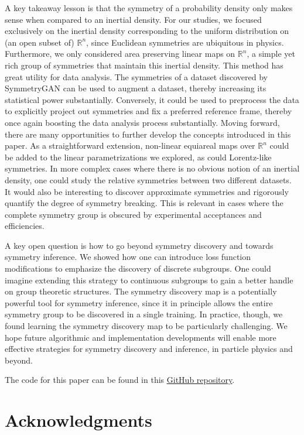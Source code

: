 \documentclass[aps,prx,reprint,preprintnumbers,superscriptaddress,nofootinbib,longbibliography,floatfix]{revtex4-1}
\newcommand{\R}{\mathbb{R}}
\begin{document}
A key takeaway lesson is that the symmetry of a probability density only makes sense when compared to an inertial density.
%
For our studies, we focused exclusively on the inertial density corresponding to the uniform distribution on (an open subset of) $\R^n$, since Euclidean symmetries are ubiquitous in physics.
%
Furthermore, we only considered area preserving linear maps on $\R^n$, a simple yet rich group of symmetries that maintain this inertial density.
%
This method has great utility for data analysis.
%
The symmetries of a dataset discovered by SymmetryGAN can be used to augment a dataset, thereby increasing its statistical power substantially.
%
Conversely, it could be used to preprocess the data to explicitly project out symmetries and fix a preferred reference frame, thereby once again boosting the data analysis process substantially.
%
Moving forward, there are many opportunities to further develop the concepts introduced in this paper.
%
As a straightforward extension, non-linear equiareal maps over $\R^n$ could be added to the linear parametrizations we explored, as could Lorentz-like symmetries.
%
In more complex cases where there is no obvious notion of an inertial density, one could study the relative symmetries between two different datasets.
%
It would also be interesting to discover approximate symmetries and rigorously quantify the degree of symmetry breaking.
%
This is relevant in cases where the complete symmetry group is obscured by experimental acceptances and efficiencies.


A key open question is how to go beyond symmetry discovery and towards symmetry inference.
%
We showed how one can introduce loss function modifications to emphasize the discovery of discrete subgroups.
%
One could imagine extending this strategy to continuous subgroups to gain a better handle on group theoretic structures.
%
The symmetry discovery map is a potentially powerful tool for symmetry inference, since it in principle allows the entire symmetry group to be discovered in a single training.
%
In practice, though, we found learning the symmetry discovery map to be particularly challenging.
%
We hope future algorithmic and implementation developments will enable more effective strategies for symmetry discovery and inference, in particle physics and beyond.

The code for this paper can be found in this \href{https://github.com/hep-lbdl/symmetrydiscovery}{\underline{GitHub repository}}.

\section*{Acknowledgments}
\end{document}
